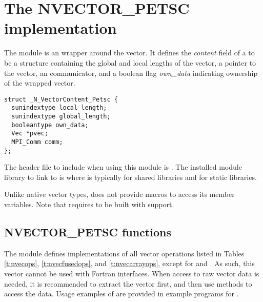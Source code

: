 %
\section{The NVECTOR\_PETSC implementation}\label{ss:nvec_petsc}

The {\nvecpetsc} module is an {\nvector} wrapper around the {\petsc} vector.
It defines the {\em content} field of a  to be a structure containing
the global and local lengths of the vector, a pointer to the {\petsc} vector,
an {\mpi} communicator, and a boolean flag {\em own\_data} indicating ownership of 
the wrapped {\petsc} vector.
\begin{verbatim} 
struct _N_VectorContent_Petsc {
  sunindextype local_length;
  sunindextype global_length;
  booleantype own_data;
  Vec *pvec;
  MPI_Comm comm;
};
\end{verbatim}
The header file to include when using this module is .
The installed module library to link to is
where  is typically  for shared libraries and 
for static libraries.

Unlike native {\sundials} vector types, {\nvecpetsc} does not provide macros 
to access its member variables.
Note that {\nvecpetsc} requires {\sundials} to be built with {\mpi} support.


\subsection{NVECTOR\_PETSC functions}
\label{ss:nvec_petsc_functions}

The {\nvecpetsc} module defines implementations of all vector operations listed 
in Tables \ref{t:nvecops}, \ref{t:nvecfusedops}, and \ref{t:nvecarrayops}, except for
 and . As such, this vector cannot be
used with {\sundials} Fortran interfaces.
When access to raw vector data is needed, it is 
recommended to extract the {\petsc} vector first, and then use {\petsc} 
methods to access the data. Usage examples of {\nvecpetsc} are provided in
example programs for {\ida} \cite{ida_ex}.

